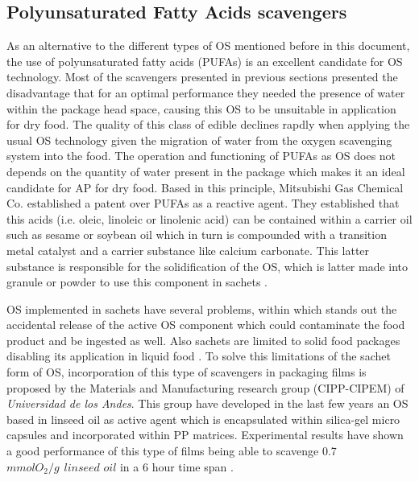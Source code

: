 \begin{refsection}
\subsection{Polyunsaturated Fatty Acids scavengers}\label{subsec:PUFA_os}
As an alternative to the different types of OS mentioned before in this document, the use of polyunsaturated fatty acids (PUFAs) is an excellent candidate for OS technology. Most of the scavengers presented in previous sections presented the disadvantage that for an optimal performance they needed the presence of water within the package head space, causing this OS to be unsuitable in application for dry food. The quality of this class of edible  declines rapdly when applying the usual OS technology given the migration of water from the oxygen scavenging system into the food. The operation and functioning of PUFAs as OS does not depends on the quantity of water present in the package which makes it an ideal candidate for AP for dry food. Based in this principle, Mitsubishi Gas Chemical  Co. established a patent over PUFAs as a reactive  agent.  They established that this acids (i.e. oleic, linoleic or linolenic acid) can be contained within a carrier oil such as sesame or soybean oil which in turn is compounded with a transition metal catalyst and a carrier substance like calcium carbonate. This latter substance is responsible for the solidification of the OS, which is latter made into granule or powder to use this component in sachets \cites{Vermeiren2003OxygenScavengers,cruz2012oxygen,Floros1997ActiveApplications}.

OS implemented in sachets have several problems, within which stands out the accidental release of the active OS component which could contaminate the food product and be ingested as well. Also sachets are limited to solid food packages disabling its application in liquid food \cite{Rooney2005IntroductionTechnologies}. To solve this limitations of the sachet form of OS, incorporation of this type of scavengers in packaging films is proposed  by  the Materials and
Manufacturing research group (CIPP-CIPEM) of \textit{Universidad de los Andes}.  This group have developed in the last few years an OS based in linseed oil as active agent which is encapsulated within silica-gel micro capsules and incorporated within PP matrices. Experimental results have shown a good  performance of this type of films being able to scavenge 0.7 $mmol O_2 /g \hspace{5pt} linseed\hspace{4pt} oil$ in a 6 hour time span \cite{GarciaMora2015KineticScavengers}. 


\end{refsection}
